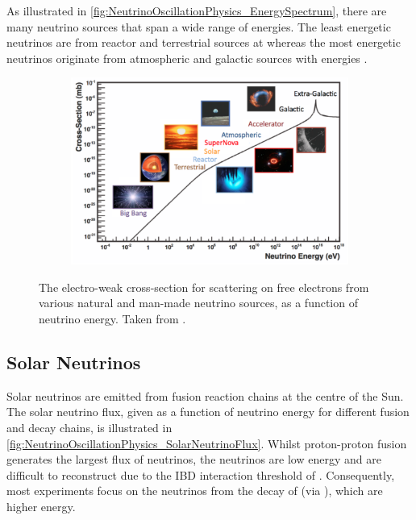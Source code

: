 As illustrated in \autoref{fig:NeutrinoOscillationPhysics_EnergySpectrum}, there are many neutrino sources that span a wide range of energies. The least energetic neutrinos are from reactor and terrestrial sources at  whereas the most energetic neutrinos originate from atmospheric and galactic sources with energies .

\begin{figure}[h]
  \begin{subfigure}[t]{0.95\textwidth}
    \includegraphics[width=\textwidth, trim={0mm 0mm 0mm 0mm}, clip,page=1]{Figures/Theory/EnergySpectrum.pdf}
  \end{subfigure}
  \caption{The electro-weak cross-section for  scattering on free electrons from various natural and man-made neutrino sources, as a function of neutrino energy. Taken from \cite{Formaggio:2012cpf}.}
  \label{fig:NeutrinoOscillationPhysics_EnergySpectrum}
\end{figure}

\subsection{Solar Neutrinos}
\label{subsec:NeutrinoOscillationPhysics_SolarNeutrinos}

Solar neutrinos are emitted from fusion reaction chains at the centre of the Sun. The solar neutrino flux, given as a function of neutrino energy for different fusion and decay chains, is illustrated in \autoref{fig:NeutrinoOscillationPhysics_SolarNeutrinoFlux}. Whilst proton-proton fusion generates the largest flux of neutrinos, the neutrinos are low energy and are difficult to reconstruct due to the IBD interaction threshold of  \cite{Oralbaev_2016}. Consequently, most experiments focus on the neutrinos from the decay of  (via ), which are higher energy.

